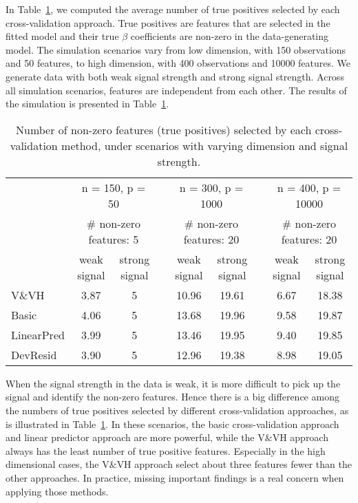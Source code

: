 In Table~\ref{Tab:power}, we computed the average number of true positives selected by each cross-validation approach. True positives are features that are selected in the fitted model and their true $\beta$ coefficients are non-zero in the data-generating model. The simulation scenarios vary from low dimension, with 150 observations and 50 features, to high dimension, with 400 observations and 10000 features. We generate data with both weak signal strength and strong signal strength. Across all simulation scenarios, features are independent from each other. The results of the simulation is presented in Table~\ref{Tab:power}.

\begin{table}[!htb]
\setlength{\tabcolsep}{3pt}
\caption{\label{Tab:power} Number of non-zero features (true positives) selected by each cross-validation method, under scenarios with varying dimension and signal strength.}
\centering
\begin{tabular}[t]{l cc c cc c cc}
\toprule
&\multicolumn{2}{c}{n = 150, p = 50} & & \multicolumn{2}{c}{n = 300, p = 1000} & & \multicolumn{2}{c}{n = 400, p = 10000} \\
&\multicolumn{2}{c}{$\#$ non-zero features: 5} & & \multicolumn{2}{c}{$\#$ non-zero features: 20} & & \multicolumn{2}{c}{$\#$ non-zero features: 20} \\
\cline{2-3} \cline{5-6} \cline{8-9}
& weak signal & strong signal & & weak signal & strong signal && weak signal & strong signal\\
V\&VH        & 3.87 & 5& & 10.96 & 19.61 & & 6.67 & 18.38\\
Basic          & 4.06 & 5& & 13.68 & 19.96 & & 9.58 & 19.87\\
LinearPred  & 3.99 & 5& & 13.46 & 19.95 & & 9.40 & 19.85\\
DevResid    & 3.90 & 5& & 12.96 & 19.38 & & 8.98 & 19.05\\
\bottomrule
\end{tabular}
\end{table}

When the signal strength in the data is weak, it is more difficult to pick up the signal and identify the non-zero features. Hence there is a big difference among the numbers of true positives selected by different cross-validation approaches, as is illustrated in Table~\ref{Tab:power}. In these scenarios, the basic cross-validation approach and linear predictor approach are more powerful, while the V$\&$VH approach always has the least number of true positive features. Especially in the high dimensional cases, the V$\&$VH approach select about three features fewer than the other approaches. In practice, missing important findings is a real concern when applying those methods.


